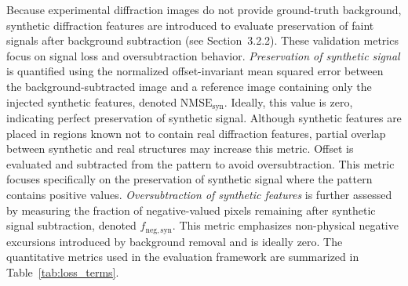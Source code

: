 \documentclass[iucr]{iucrjournals}
\begin{document}
Because experimental diffraction images do not provide ground-truth background, synthetic diffraction features are introduced to evaluate preservation of faint signals after background subtraction (see Section~3.2.2). These validation metrics focus on signal loss and oversubtraction behavior. \textit{Preservation of synthetic signal} is quantified using the normalized offset-invariant mean squared error between the background-subtracted image and a reference image containing only the injected synthetic features, denoted $\mathrm{NMSE}_{\mathrm{syn}}$. Ideally, this value is zero, indicating perfect preservation of synthetic signal. Although synthetic features are placed in regions known not to contain real diffraction features, partial overlap between synthetic and real structures may increase this metric. Offset is evaluated and subtracted from the pattern to avoid oversubtraction. This metric focuses specifically on the preservation of synthetic signal where the pattern contains positive values. \textit{Oversubtraction of synthetic features} is further assessed by measuring the fraction of negative-valued pixels remaining after synthetic signal subtraction, denoted $f_{\mathrm{neg,syn}}$. This metric emphasizes non-physical negative excursions introduced by background removal and is ideally zero. The quantitative metrics used in the evaluation framework are summarized in Table~\ref{tab:loss_terms}.
\end{document}
